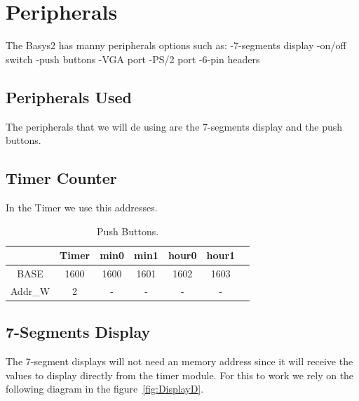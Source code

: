 \section{Peripherals}
\label{sec:periphs}

The Basys2 has manny peripherals options such as:
-7-segments display
-on/off switch
-push buttons
-VGA port
-PS/2 port
-6-pin headers

\subsection{Peripherals Used}

The peripherals that we will de using are the 7-segments display and the push buttons.


\subsection{Timer Counter}

In the Timer we use this addresses.

\begin{table}[h]
\centering
\caption{Push Buttons.}
\sffamily
    \begin{tabular}{|c|c|c|c|c|c|c|}
        \hline
        \textbf{} & \textbf{Timer} & \textbf{min0} & \textbf{min1} & \textbf{hour0} & \textbf{hour1} \\ [0.5ex]
        \hline
        \hline
        BASE & 1600 & 1600 & 1601 & 1602 & 1603 \\
        \hline
        Addr\_W & 2 & - & - & - & - \\
        \hline
    \end{tabular}
\end{table}



\subsection{7-Segments Display}

The 7-segment displays will not need an memory address since it will receive the values to display directly from the timer module. For this to work we rely on the following diagram in the figure~\ref{fig:DisplayD}.

